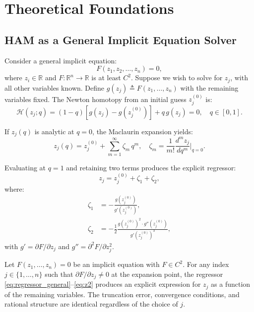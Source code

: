\documentclass[lettersize,journal]{IEEEtran}
\begin{document}
\section{Theoretical Foundations}
\label{sec:foundations}

\subsection{HAM as a General Implicit Equation Solver}

Consider a general implicit equation:
\begin{equation}
\label{eq:implicit_general}
F(z_1, z_2, \ldots, z_n) = 0,
\end{equation}
where $z_i \in \mathbb{R}$ and $F: \mathbb{R}^n \to \mathbb{R}$ is at least $C^2$. Suppose we wish to solve for $z_j$, with all other variables known. Define $g(z_j) \triangleq F(z_1, \ldots, z_n)$ with the remaining variables fixed. The Newton homotopy from an initial guess $z_j^{(0)}$ is:
\begin{equation}
\label{eq:homotopy}
\mathcal{H}(z_j; q) = (1 - q)\left[g(z_j) - g(z_j^{(0)})\right] + q\, g(z_j) = 0, \quad q \in [0,1].
\end{equation}

If $z_j(q)$ is analytic at $q = 0$, the Maclaurin expansion yields:
\begin{equation}
\label{eq:series}
z_j(q) = z_j^{(0)} + \sum_{m=1}^{\infty} \zeta_m \, q^m, \quad \zeta_m = \frac{1}{m!} \frac{d^m z_j}{dq^m}\bigg|_{q=0}.
\end{equation}

Evaluating at $q = 1$ and retaining two terms produces the explicit regressor:
\begin{equation}
\label{eq:regressor_general}
z_j = z_j^{(0)} + \zeta_1 + \zeta_2,
\end{equation}
where:
\begin{align}
\zeta_1 &= -\frac{g(z_j^{(0)})}{g'(z_j^{(0)})}, \label{eq:z1} \\
\zeta_2 &= -\frac{1}{2} \frac{g(z_j^{(0)})^2 \cdot g''(z_j^{(0)})}{g'(z_j^{(0)})^3}, \label{eq:z2}
\end{align}
with $g' = \partial F / \partial z_j$ and $g'' = \partial^2 F / \partial z_j^2$.

\begin{theorem}
\label{thm:agnostic}
Let $F(z_1, \ldots, z_n) = 0$ be an implicit equation with $F \in C^2$. For any index $j \in \{1, \ldots, n\}$ such that $\partial F / \partial z_j \neq 0$ at the expansion point, the regressor \eqref{eq:regressor_general}--\eqref{eq:z2} produces an explicit expression for $z_j$ as a function of the remaining variables. The truncation error, convergence conditions, and rational structure are identical regardless of the choice of $j$.
\end{theorem}
\end{document}
